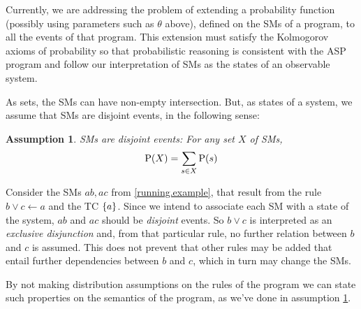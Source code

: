 \documentclass{article}
\newtheorem{assumption}{Assumption}
\newcommand{\at}[1]{\ensuremath{\!\del{#1}}}
\newcommand{\prfunc}{\ensuremath{\mathrm{P}}}
\newcommand{\pr}[1]{\ensuremath{\prfunc\at{#1}}}
\begin{document}
Currently, we are addressing the problem of extending a probability
function (possibly using parameters such as $\theta$ above), defined
on the \acp{SM} of a program, to all the events of that program.  This
extension must satisfy the Kolmogorov axioms of probability so that
probabilistic reasoning is consistent with the \ac{ASP} program and
follow our interpretation of \aclp{SM} as the states of an observable
system.

As sets, the \acp{SM} can have non-empty intersection.  But, as states
of a system, we assume that \acp{SM} are disjoint events, in the
following sense:

\begin{assumption}\label{assumption:smodels.disjoint}
  \Aclp{SM} are disjoint events: For any set $X$ of \aclp{SM},
  \begin{equation}
	\pr{X} = \sum_{s\in X}\pr{s}
  \end{equation}
\end{assumption}

Consider the \aclp{SM} $ab, ac$ from \cref{running.example}, that
result from the rule $b \vee c \leftarrow a$ and the \acl{TC}
$\set{a}$.  Since we intend to associate each \acl{SM} with a state of
the system, $ab$ and $ac$ should be \emph{disjoint} events.  So
$b \vee c$ is interpreted as an \emph{exclusive disjunction} and, from
that particular rule, no further relation between $b$ and $c$ is
assumed.  This does not prevent that other rules may be added that
entail further dependencies between $b$ and $c$, which in turn may
change the \aclp{SM}.

By not making distribution assumptions on the rules of the program we
can state such properties on the semantics of the program, as we've
done in assumption \ref{assumption:smodels.disjoint}.
%
%
%
\end{document}
